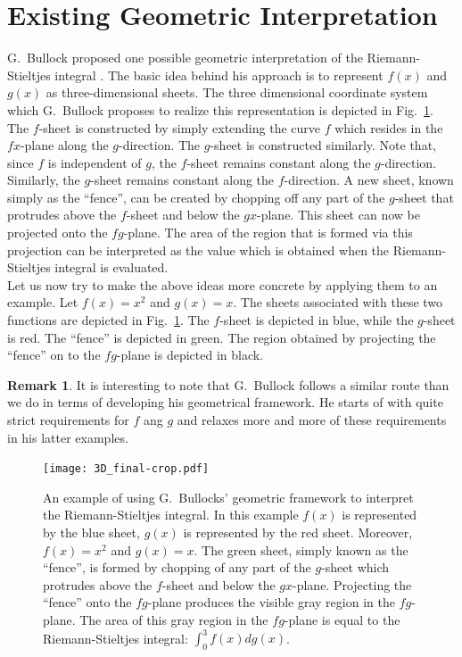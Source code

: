 \documentclass{article}
\theoremstyle{theorem}
\theoremstyle{definition}
\newtheorem*{remark}{Remark}
\begin{document}

\section{Existing Geometric Interpretation}
G.~Bullock proposed one possible geometric interpretation of the Riemann-Stieltjes integral \cite{bullock1988}. 
The basic idea behind his approach is to represent $f(x)$ and $g(x)$ as three-dimensional sheets. 
The three dimensional coordinate system which G.~Bullock proposes to realize this representation is depicted in 
Fig.~\ref{fig:bullock}. The $f$-sheet is constructed by simply extending the curve $f$ which resides in the $fx$-plane 
along the $g$-direction. The $g$-sheet is constructed similarly. Note that, since $f$ is independent of $g$, the $f$-sheet remains 
constant along the $g$-direction. Similarly, the $g$-sheet remains constant along the $f$-direction. 
A new sheet, known simply as the ``fence'', can be created by chopping off any part of the $g$-sheet that protrudes above the 
$f$-sheet and below the $gx$-plane. This sheet can now be projected onto the $fg$-plane. The area of the region that is formed 
via this projection can be interpreted as the value which is obtained when the Riemann-Stieltjes integral is evaluated.\\ 

\noindent
Let us now try to make the above ideas more concrete by applying them to an example. Let $f(x)=x^2$ and 
$g(x)=x$. The sheets associated with these two functions are depicted in Fig.~\ref{fig:bullock}. 
The $f$-sheet is depicted in blue, while the $g$-sheet is red. The ``fence'' is depicted in green. The region
obtained by projecting the ``fence'' on to the $fg$-plane is depicted in black.\\

\noindent
\begin{remark}
It is interesting to note that G.~Bullock follows a similar route than we do in terms of developing his geometrical framework.
He starts of with quite strict requirements for $f$ ang $g$ and relaxes more and more of these requirements in his latter 
examples. 
\end{remark}

\begin{figure}[htb]
\centering
\texttt{[image: 3D\_final-crop.pdf]}
\caption{An example of using G.~Bullocks' geometric framework to interpret the Riemann-Stieltjes integral. In this example 
$f(x)$ is represented by the blue sheet, $g(x)$ is represented by the red sheet. Moreover, $f(x)=x^2$ and $g(x)=x$. The green sheet, simply known as the ``fence'', is formed 
by chopping of any part of the $g$-sheet which protrudes above the $f$-sheet and below the $gx$-plane. Projecting the ``fence''
onto the $fg$-plane produces the visible gray region in the $fg$-plane. The area of this gray region in the $fg$-plane is equal to the Riemann-Stieltjes integral:
$\int_{0}^{3} f(x) dg(x)$.}
\label{fig:bullock}
\end{figure}
\end{document}

